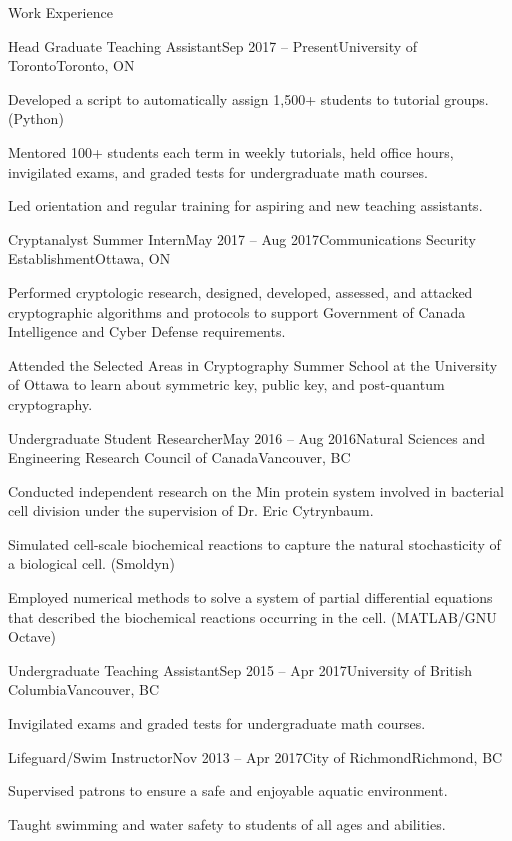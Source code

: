 \documentclass{resume}
\begin{document}
\begin{rSection}{Work Experience}

\begin{rSubsection}{Head Graduate Teaching Assistant}{Sep 2017 -- Present}{University of Toronto}{Toronto, ON}
    \item Developed a script to automatically assign 1,500+ students to tutorial groups. (Python)
    \item Mentored 100+ students each term in weekly tutorials, held office hours, invigilated exams, and graded tests for undergraduate math courses.
    \item Led orientation and regular training for aspiring and new teaching assistants.
\end{rSubsection}

\begin{rSubsection}{Cryptanalyst Summer Intern}{May 2017 -- Aug 2017}{Communications Security Establishment}{Ottawa, ON}
    \item Performed cryptologic research, designed, developed, assessed, and attacked cryptographic algorithms and protocols to support Government of Canada Intelligence and Cyber Defense requirements.
    \item Attended the Selected Areas in Cryptography Summer School at the University of Ottawa to learn about symmetric key, public key, and post-quantum cryptography.
\end{rSubsection}

\begin{rSubsection}{Undergraduate Student Researcher}{May 2016 -- Aug 2016}{Natural Sciences and Engineering Research Council of Canada}{Vancouver, BC}
    \item Conducted independent research on the Min protein system involved in bacterial cell division under the supervision of Dr. Eric Cytrynbaum.
    \item Simulated cell-scale biochemical reactions to capture the natural stochasticity of a biological cell. (Smoldyn)
    \item Employed numerical methods to solve a system of partial differential equations that described the biochemical reactions occurring in the cell. (MATLAB/GNU Octave)
\end{rSubsection}

\begin{rSubsection}{Undergraduate Teaching Assistant}{Sep 2015 -- Apr 2017}{University of British Columbia}{Vancouver, BC}
    \item Invigilated exams and graded tests for undergraduate math courses.
\end{rSubsection}

\begin{rSubsection}{Lifeguard/Swim Instructor}{Nov 2013 -- Apr 2017}{City of Richmond}{Richmond, BC}
    \item Supervised patrons to ensure a safe and enjoyable aquatic environment.
    \item Taught swimming and water safety to students of all ages and abilities.
\end{rSubsection}

\end{rSection}
\end{document}
